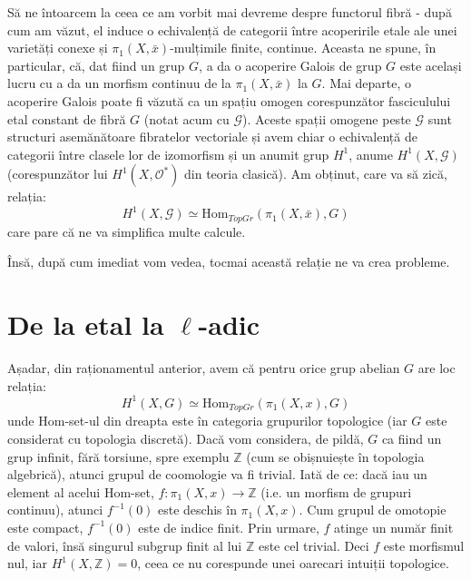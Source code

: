 \documentclass[13pt,openany]{book}
\begin{document}
Să ne întoarcem la ceea ce am vorbit mai devreme despre functorul fibră - după cum am văzut, el induce o echivalență de categorii între acoperirile etale ale unei varietăți conexe și $\pi_1(X,\bar{x})$-mulțimile finite, continue. Aceasta ne spune, în particular, că, dat fiind un grup $G$, a da o acoperire Galois de grup $G$ este același lucru cu a da un morfism continuu de la $\pi_1(X,\bar{x})$ la $G$. Mai departe, o acoperire Galois poate fi văzută ca un spațiu omogen corespunzător fasciculului etal constant de fibră $G$ (notat acum cu $\mathcal{G}$). Aceste spații omogene peste $\mathcal{G}$ sunt structuri asemănătoare fibratelor vectoriale și avem chiar o echivalență de categorii între clasele lor de izomorfism și un anumit grup $H^1$, anume $H^1(X,\mathcal{G})$ (corespunzător lui $H^1(X,\mathcal{O}^*)$ din teoria clasică). Am obținut, care va să zică, relația:
$$H^1(X,\mathcal{G}) \simeq \text{Hom}_{TopGr}(\pi_1(X,\bar{x}),G)$$
care pare că ne va simplifica multe calcule.

Însă, după cum imediat vom vedea, tocmai această relație ne va crea probleme.

\chapter{De la etal la \texorpdfstring{$\ell$}{l}-adic}

Așadar, din raționamentul anterior, avem că pentru orice grup abelian $G$ are loc relația:
$$H^1(X,G)\simeq \text{Hom}_{TopGr}(\pi_1(X,x),G)$$
unde Hom-set-ul din dreapta este în categoria grupurilor topologice (iar $G$ este considerat cu topologia discretă). Dacă vom considera, de pildă, $G$ ca fiind un grup infinit, fără torsiune, spre exemplu $\mathbb{Z}$ (cum se obișnuiește în topologia algebrică), atunci grupul de coomologie va fi trivial. Iată de ce: dacă iau un element al acelui Hom-set, $f: \pi_1(X,x) \rightarrow \mathbb{Z}$ (i.e. un morfism de grupuri continuu), atunci $f^{-1}(0)$ este deschis în $\pi_1(X,x)$. Cum grupul de omotopie este compact, $f^{-1}(0)$ este de indice finit. Prin urmare, $f$ atinge un număr finit de valori, însă singurul subgrup finit al lui $\mathbb{Z}$ este cel trivial. Deci $f$ este morfismul nul, iar $H^1(X,\mathbb{Z})=0$, ceea ce nu corespunde unei oarecari intuiții topologice.
\end{document}
